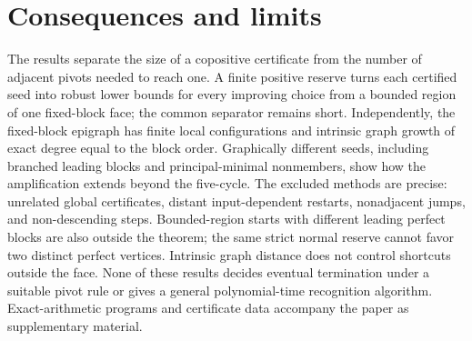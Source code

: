 \section{Consequences and limits}\label{sec:scope}
The results separate the size of a copositive certificate from the number of adjacent pivots needed to reach one. A finite positive reserve turns each certified seed into robust lower bounds for every improving choice from a bounded region of one fixed-block face; the common separator remains short. Independently, the fixed-block epigraph has finite local configurations and intrinsic graph growth of exact degree equal to the block order. Graphically different seeds, including branched leading blocks and principal-minimal nonmembers, show how the amplification extends beyond the five-cycle. The excluded methods are precise: unrelated global certificates, distant input-dependent restarts, nonadjacent jumps, and non-descending steps. Bounded-region starts with different leading perfect blocks are also outside the theorem; the same strict normal reserve cannot favor two distinct perfect vertices. Intrinsic graph distance does not control shortcuts outside the face. None of these results decides eventual termination under a suitable pivot rule or gives a general polynomial-time recognition algorithm. Exact-arithmetic programs and certificate data accompany the paper as supplementary material.
